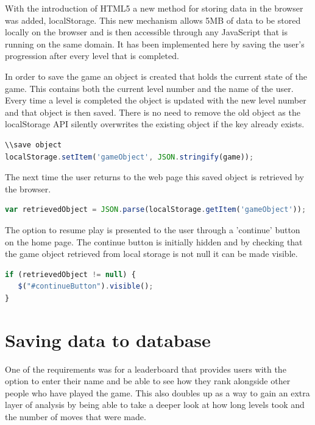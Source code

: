 \documentclass[12pt,a4paper]{report}
\begin{document}
With the introduction of HTML5 a new method for storing data in the browser was added, localStorage. This new mechanism allows 5MB of data to be stored locally on the browser and is then accessible through any JavaScript that is running on the same domain. It has been implemented here by saving the user's progression after every level that is completed.

In order to save the game an object is created that holds the current state of the game. This contains both the current level number and the name of the user. Every time a level is completed the object is updated with the new level number and that object is then saved. There is no need to remove the old object as the localStorage API silently overwrites the existing object if the key already exists.

\begin{minipage}{\linewidth}
\begin{lstlisting}[language=JavaScript]
\\save object
localStorage.setItem('gameObject', JSON.stringify(game));
\end{lstlisting}
\end{minipage}

The next time the user returns to the web page this saved object is retrieved by the browser.

\begin{minipage}{\linewidth}
\begin{lstlisting}[language=JavaScript]
var retrievedObject = JSON.parse(localStorage.getItem('gameObject'));
\end{lstlisting}
\end{minipage}

The option to resume play is presented to the user through a 'continue' button on the home page. The continue button is initially hidden and by checking that the game object retrieved from local storage is not null it can be made visible.

\begin{minipage}{\linewidth}
\begin{lstlisting}[language=JavaScript]
if (retrievedObject != null) {
   $("#continueButton").visible();
}
\end{lstlisting}
\end{minipage}

\section{Saving data to database}
One of the requirements was for a leaderboard that provides users with the option to enter their name and be able to see how they rank alongside other people who have played the game. This also doubles up as a way to gain an extra layer of analysis by being able to take a deeper look at how long levels took and the number of moves that were made. 
\end{document}
